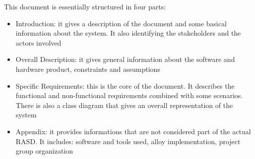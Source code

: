 This document is essentially structured in four parts:
\begin{itemize}
	\item Introduction: it gives a description of the  document and some basical information about the system. It also identifying the stakeholders and the actors involved
	\item Overall Description: it gives general information about the software and hardware product, constraints and assumptions
	\item Specific Requirements: this is the core of the document. It describes the functional and non-functional requirements combined with some scenarios. There is also a class diagram that gives an overall representation of the system
	\item Appendix: it provides informations that are not considered part of the actual RASD. It includes: software and tools used, alloy implementation, project group organization	
\end{itemize}